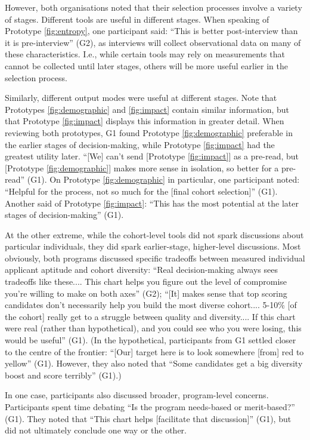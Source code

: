 However, both organisations noted that their selection processes involve a variety of stages. Different tools are useful in different stages. When speaking of Prototype \ref{fig:entropy}, one participant said: ``This is better post-interview than it is pre-interview'' (G2), as interviews will collect observational data on many of these characteristics. I.e., while certain tools may rely on measurements that cannot be collected until later stages, others will be more useful earlier in the selection process.

Similarly, different output modes were useful at different stages. Note that Prototypes \ref{fig:demographic} and \ref{fig:impact} contain similar information, but that Prototype \ref{fig:impact} displays this information in greater detail. When reviewing both prototypes, G1 found Prototype \ref{fig:demographic} preferable in the earlier stages of decision-making, while Prototype \ref{fig:impact} had the greatest utility later. ``[We] can't send [Prototype \ref{fig:impact}] as a pre-read, but [Prototype \ref{fig:demographic}] makes more sense in isolation, so better for a pre-read'' (G1). On Prototype \ref{fig:demographic} in particular, one participant noted: ``Helpful for the process, not so much for the [final cohort selection]'' (G1). Another said of Prototype \ref{fig:impact}: ``This has the most potential at the later stages of decision-making'' (G1).

At the other extreme, while the cohort-level tools did not spark discussions about particular individuals, they did spark earlier-stage, higher-level discussions. Most obviously, both programs discussed specific tradeoffs between measured individual applicant aptitude and cohort diversity: ``Real decision-making always sees tradeoffs like these.... This chart helps you figure out the level of compromise you're willing to make on both axes'' (G2); ``[It] makes sense that top scoring candidates don't necessarily help you build the most diverse cohort.... 5-10\% [of the cohort] really get to a struggle between quality and diversity.... If this chart were real (rather than hypothetical), and you could see who you were losing, this would be useful'' (G1). (In the hypothetical,  participants from G1 settled closer to the centre of the frontier: ``[Our] target here is to look somewhere [from] red to yellow'' (G1). However, they also noted that ``Some candidates get a big diversity boost and score terribly'' (G1).)

In one case, participants also discussed broader, program-level concerns. Participants spent time debating ``Is the program needs-based or merit-based?'' (G1). They noted  that ``This chart helps [facilitate that discussion]'' (G1), but did not ultimately conclude one way or the other.

